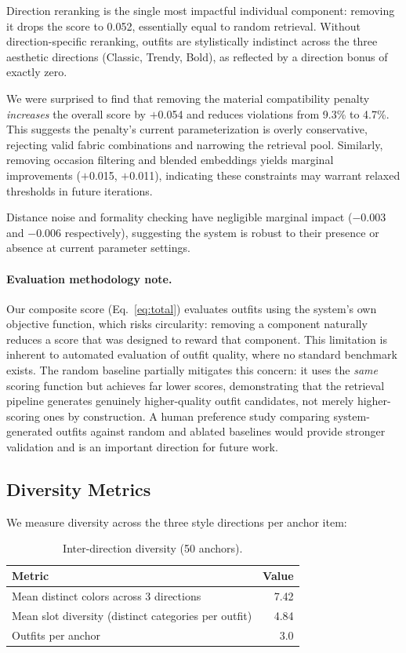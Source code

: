 \documentclass[10pt,twocolumn]{article}
\begin{document}
Direction reranking is the single most impactful individual component:
removing it drops the score to 0.052, essentially equal to random
retrieval.  Without direction-specific reranking, outfits are
stylistically indistinct across the three aesthetic directions (Classic,
Trendy, Bold), as reflected by a direction bonus of exactly zero.

We were surprised to find that removing the material compatibility penalty
\emph{increases} the overall score by $+$0.054 and reduces violations from
9.3\% to 4.7\%.  This suggests the penalty's current parameterization is
overly conservative, rejecting valid fabric combinations and narrowing the
retrieval pool.  Similarly, removing occasion filtering and blended
embeddings yields marginal improvements ($+$0.015, $+$0.011), indicating
these constraints may warrant relaxed thresholds in future iterations.

Distance noise and formality checking have negligible marginal impact
($-$0.003 and $-$0.006 respectively), suggesting the system is robust to
their presence or absence at current parameter settings.

\paragraph{Evaluation methodology note.}
Our composite score (Eq.~\ref{eq:total}) evaluates outfits using the
system's own objective function, which risks circularity: removing a
component naturally reduces a score that was designed to reward that
component.  This limitation is inherent to automated evaluation of outfit
quality, where no standard benchmark exists.  The random baseline partially
mitigates this concern: it uses the \emph{same} scoring function but
achieves far lower scores, demonstrating that the retrieval pipeline
generates genuinely higher-quality outfit candidates, not merely
higher-scoring ones by construction.  A human preference study comparing
system-generated outfits against random and ablated baselines would
provide stronger validation and is an important direction for future work.

\subsection{Diversity Metrics}

We measure diversity across the three style directions per anchor item:

\begin{table}[t]
\centering
\small
\caption{Inter-direction diversity (50 anchors).}
\label{tab:diversity}
\begin{tabular}{lr}
\toprule
Metric & Value \\
\midrule
Mean distinct colors across 3 directions & 7.42 \\
Mean slot diversity (distinct categories per outfit) & 4.84 \\
Outfits per anchor & 3.0 \\
\bottomrule
\end{tabular}
\end{table}
\end{document}
